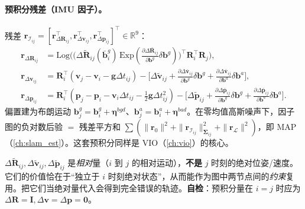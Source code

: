 \paragraph{预积分残差（IMU 因子）。}
残差 $\mathbf{r}_{\mathcal{I}_{ij}}=[\mathbf{r}_{\Delta\mathbf{R}_{ij}}^\top,\mathbf{r}_{\Delta\mathbf{v}_{ij}}^\top,\mathbf{r}_{\Delta\mathbf{p}_{ij}}^\top]^\top\in\mathbb{R}^9$\cite{forster2017preintegration}：
\begin{align}
  \mathbf{r}_{\Delta\mathbf{R}_{ij}}&=\mathrm{Log}\Big(\big(\Delta\tilde{\mathbf{R}}_{ij}(\bar{\mathbf{b}}^g_i)\,\mathrm{Exp}(\tfrac{\partial\Delta\bar{\mathbf{R}}_{ij}}{\partial\mathbf{b}^g}\delta\mathbf{b}^g)\big)^\top\mathbf{R}_i^\top\mathbf{R}_j\Big), \label{eq:lidar-forster-rR}\\
  \mathbf{r}_{\Delta\mathbf{v}_{ij}}&=\mathbf{R}_i^\top(\mathbf{v}_j-\mathbf{v}_i-\mathbf{g}\Delta t_{ij})-\Big[\Delta\tilde{\mathbf{v}}_{ij}+\tfrac{\partial\Delta\bar{\mathbf{v}}_{ij}}{\partial\mathbf{b}^g}\delta\mathbf{b}^g+\tfrac{\partial\Delta\bar{\mathbf{v}}_{ij}}{\partial\mathbf{b}^a}\delta\mathbf{b}^a\Big], \label{eq:lidar-forster-rv}\\
  \mathbf{r}_{\Delta\mathbf{p}_{ij}}&=\mathbf{R}_i^\top(\mathbf{p}_j-\mathbf{p}_i-\mathbf{v}_i\Delta t_{ij}-\tfrac12\mathbf{g}\Delta t_{ij}^2)-\Big[\Delta\tilde{\mathbf{p}}_{ij}+\tfrac{\partial\Delta\bar{\mathbf{p}}_{ij}}{\partial\mathbf{b}^g}\delta\mathbf{b}^g+\tfrac{\partial\Delta\bar{\mathbf{p}}_{ij}}{\partial\mathbf{b}^a}\delta\mathbf{b}^a\Big]. \label{eq:lidar-forster-rp}
\end{align}
偏置建为布朗运动 $\mathbf{b}^g_j=\mathbf{b}^g_i+\boldsymbol{\eta}^{bgd}$、$\mathbf{b}^a_j=\mathbf{b}^a_i+\boldsymbol{\eta}^{bad}$。在零均值高斯噪声下，因子图的负对数后验 $=$ 残差平方和 $\sum(\|\mathbf{r}_0\|^2+\|\mathbf{r}_{\mathcal{I}_{ij}}\|^2_{\boldsymbol{\Sigma}_{ij}}+\|\mathbf{r}_{\mathcal{L}}\|^2)$，即 MAP（\cref{ch:slam_est}）。这套预积分同样是 VIO（\cref{ch:vio}）的核心。

\begin{pitfall}
$\Delta\tilde{\mathbf{R}}_{ij},\Delta\tilde{\mathbf{v}}_{ij},\Delta\tilde{\mathbf{p}}_{ij}$ 是\emph{相对}量（$i$ 到 $j$ 的相对运动），\textbf{不是} $j$ 时刻的绝对位姿/速度。它们的价值恰在于“独立于 $i$ 时刻绝对状态”，从而能作为图中两节点间的\emph{约束}复用。把它们当绝对量代入会得到完全错误的轨迹。\textbf{自检}：预积分量在 $i=j$ 时应为 $\Delta\mathbf{R}=\mathbf{I},\Delta\mathbf{v}=\Delta\mathbf{p}=\mathbf{0}$。
\end{pitfall}

